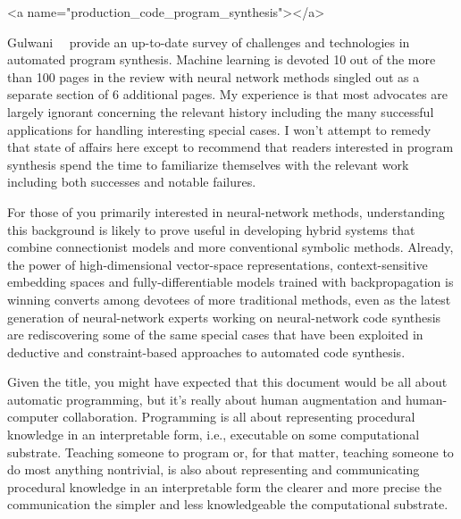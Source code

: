 
\rawhtml
<a name="production_code_program_synthesis"></a>
\endrawhtml
{}


Gulwani~\etal{}~\cite{GulwanietalFaTiPL-17} provide an up-to-date survey of challenges and technologies in automated program synthesis. Machine learning is devoted 10 out of the more than 100 pages in the review with neural network methods singled out as a separate section of 6 additional pages. My experience is that most advocates are largely ignorant concerning the relevant history including the many successful applications for handling interesting special cases. I won't attempt to remedy that state of affairs here except to recommend that readers interested in program synthesis spend the time to familiarize themselves with the relevant work including both successes and notable failures. 

For those of you primarily interested in neural-network methods, understanding this background is likely to prove useful in developing hybrid systems that combine connectionist models and more conventional symbolic methods. Already, the power of high-dimensional vector-space representations, context-sensitive embedding spaces and fully-differentiable models trained with backpropagation is winning converts among devotees of more traditional methods, even as the latest generation of neural-network experts working on neural-network code synthesis are rediscovering some of the same special cases that have been exploited in deductive and constraint-based approaches to automated code synthesis.


Given the title, you might have expected that this document would be all about automatic programming, but it's really about human augmentation and human-computer collaboration. Programming is all about representing procedural knowledge in an interpretable form, i.e., executable on some computational substrate. Teaching someone to program or, for that matter, teaching someone to do most anything nontrivial, is also about representing and communicating procedural knowledge in an interpretable form \emdash{} the clearer and more precise the communication the simpler and less knowledgeable the computational substrate.

